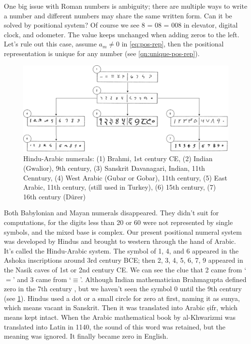 \documentclass[b5paper]{article}
\begin{document}
One big issue with Roman numbers is ambiguity; there are multiple ways to write a number and different numbers may share the same written form. Can it be solved by positional system? Of course we see 8 = 08 = 008 in elevator, digital clock, and odometer. The value keeps unchanged when adding zeros to the left. Let's rule out this case, assume $a_m \ne 0$ in \cref{eq:pos-rep}, then the positional representation is unique for any number (see \cref{qn:unique-pos-rep}).

%
\begin{figure}[htbp]
 \centering
 \includegraphics[scale=0.3]{img/Hindu-arabic-num}
 \caption{Hindu-Arabic numerals: (1) Brahmi, 1st century CE, (2) Indian (Gwalior), 9th century, (3) Sanskrit Davanagari, Indian, 11th Cenntury, (4) West Arabic (Gubar or Gobar), 11th century, (5) East Arabic, 11th century, (still used in Turkey), (6) 15th century, (7) 16th century (Dürer)}
 \label{fig:hindu-arabic-numerals}
\end{figure}

   \label{sec:hindu-arabic-numerals}
Both Babylonian and Mayan numerals disappeared. They didn't suit for computations, for the digits less than 20 or 60 were not represented by single symbols, and the mixed base is complex. Our present positional numeral system was developed by Hindus and brought to western through the hand of Arabic. It's called the Hindu-Arabic system. The symbol of 1, 4, and 6 appeared in the Ashoka inscriptions around 3rd century BCE; then 2, 3, 4, 5, 6, 7, 9 appeared in the Nasik caves of 1st or 2nd century CE. We can see the clue that 2 came from `$=$' and 3 came from `$\equiv$'. Although Indian mathematician Brahmagupta defined zero in the 7th century \cite{MacTutor-Brahmagupta-2000}, but we haven't seen the symbol 0 until the 9th century (see \cref{fig:hindu-arabic-numerals}). Hindus used a dot or a small circle for zero at first, naming it as sunya, which means vacant in Sanskrit. Then it was translated into Arabic ṣifr, which means kept intact. When the Arabic mathematical book by al-Khwarizmi was translated into Latin in 1140, the sound of this word was retained, but the meaning was ignored. It finally became zero in English.
\end{document}
